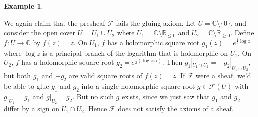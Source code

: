 \documentclass[10pt,oneside]{book}
\def\~#1{\mathscr{#1}}
\newcommand{\C}{\mathbb{C}}
\newcommand{\R}{\mathbb{R}}
\theoremstyle{plain}
\theoremstyle{definition}
\newtheorem{ex}[thm]{Example}
\theoremstyle{remark}
\numberwithin{equation}{section}
\numberwithin{figure}{section}
\begin{document}
\begin{ex}
\begin{enumerate}[label=(\roman*)]
        We again claim that the presheaf $\~F$ fails the gluing axiom. Let $U = \C \setminus \{0\}$, and consider the open cover $U = U_1 \cup U_2$ where $U_1 = \C \setminus \R_{\le 0}$ and $U_2 = \C \setminus \R_{\ge 0}$. Define $f: U \to \C$ by $f(z) = z$. On $U_1$, $f$ has a holomorphic square root $g_1(z)  =e^{\frac{1}{2} \log z}$ where $\log z$ is a principal branch of the logarithm that is holomorphic on $U_1$. On $U_2$, $f$ has a holomorphic square root $g_2 = e^{\frac{1}{2} (\log z \pi i)}$. Then $g_1|_{U_1 \cap U_2} = -g_2|_{U_1 \cap U_2}$, but both $g_1$ and $-g_2$ are valid square roots of $f(z) = z$. If $\~F$ were a sheaf, we'd be able to glue $g_1$ and $g_2$ into a single holomorphic square root $g \in \~F(U)$ with $g|_{U_1} = g_1$ and $g|_{U_2} = g_2$. But no such $g$ exists, since we just saw that $g_1$ and $g_2$ differ by a sign on $U_1 \cap U_2$. Hence $\~F$ does not satisfy the axioms of a sheaf.
    \end{enumerate}
\end{ex}
\end{document}
